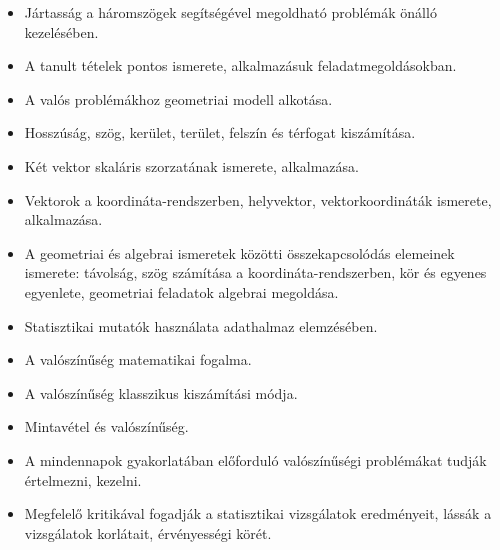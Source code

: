 \begin{itemize}
\item Jártasság a háromszögek segítségével megoldható problémák önálló kezelésében.
\item A tanult tételek pontos ismerete, alkalmazásuk feladatmegoldásokban.
\item A valós problémákhoz geometriai modell alkotása.
\item Hosszúság, szög, kerület, terület, felszín és térfogat kiszámítása.
\item Két vektor skaláris szorzatának ismerete, alkalmazása.
\item Vektorok a koordináta-rendszerben, helyvektor, vektorkoordináták ismerete, alkalmazása.
\item A geometriai és algebrai ismeretek közötti összekapcsolódás elemeinek ismerete: távolság, szög számítása a koordináta-rendszerben, kör és egyenes egyenlete, geometriai feladatok algebrai megoldása.
\item Statisztikai mutatók használata adathalmaz elemzésében.
\item A valószínűség matematikai fogalma.
\item A valószínűség klasszikus kiszámítási módja.
\item Mintavétel és valószínűség.
\item A mindennapok gyakorlatában előforduló valószínűségi problémákat tudják értelmezni, kezelni.
\item Megfelelő kritikával fogadják a statisztikai vizsgálatok eredményeit, lássák a vizsgálatok korlátait, érvényességi körét.
\end{itemize}
